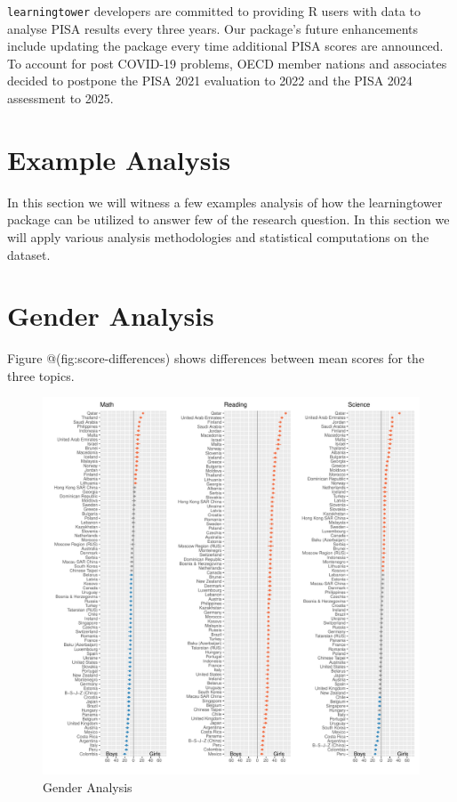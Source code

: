 \texttt{learningtower} developers are committed to providing R users
with data to analyse PISA results every three years. Our package's
future enhancements include updating the package every time additional
PISA scores are announced. To account for post COVID-19 problems, OECD
member nations and associates decided to postpone the PISA 2021
evaluation to 2022 and the PISA 2024 assessment to 2025.

\hypertarget{example-analysis}{%
\section{Example Analysis}\label{example-analysis}}

In this section we will witness a few examples analysis of how the
learningtower package can be utilized to answer few of the research
question. In this section we will apply various analysis methodologies
and statistical computations on the dataset.

\hypertarget{gender-analysis}{%
\section{Gender Analysis}\label{gender-analysis}}

Figure @(fig:score-differences) shows differences between mean scores
for the three topics.

\begin{Schunk}
\begin{figure}
\includegraphics[width=1\linewidth]{learningtower_files/figure-latex/score-differences-1} \caption[Gender Analysis]{Gender Analysis}\label{fig:score-differences}
\end{figure}
\end{Schunk}

